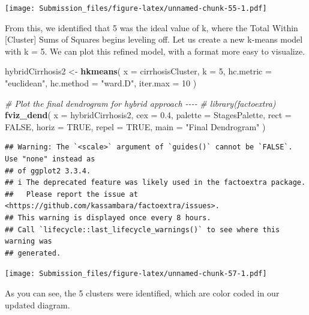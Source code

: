 \documentclass[
]{article}
\newenvironment{Shaded}{\begin{snugshade}}{\end{snugshade}}
\newcommand{\AttributeTok}[1]{\textcolor[rgb]{0.13,0.29,0.53}{#1}}
\newcommand{\CommentTok}[1]{\textcolor[rgb]{0.56,0.35,0.01}{\textit{#1}}}
\newcommand{\ConstantTok}[1]{\textcolor[rgb]{0.56,0.35,0.01}{#1}}
\newcommand{\DecValTok}[1]{\textcolor[rgb]{0.00,0.00,0.81}{#1}}
\newcommand{\FloatTok}[1]{\textcolor[rgb]{0.00,0.00,0.81}{#1}}
\newcommand{\FunctionTok}[1]{\textcolor[rgb]{0.13,0.29,0.53}{\textbf{#1}}}
\newcommand{\NormalTok}[1]{#1}
\newcommand{\OtherTok}[1]{\textcolor[rgb]{0.56,0.35,0.01}{#1}}
\newcommand{\StringTok}[1]{\textcolor[rgb]{0.31,0.60,0.02}{#1}}
\begin{document}
\texttt{[image: Submission\_files/figure-latex/unnamed-chunk-55-1.pdf]}

From this, we identified that 5 was the ideal value of k, where the
Total Within {[}Cluster{]} Sums of Squares begins leveling off. Let us
create a new k-means model with k = 5. We can plot this refined model,
with a format more easy to visualize.

\begin{Shaded}
\begin{Highlighting}[]
\NormalTok{hybridCirrhosis2 }\OtherTok{\textless{}{-}} \FunctionTok{hkmeans}\NormalTok{(}
  \AttributeTok{x =}\NormalTok{ cirrhosisCluster,}
  \AttributeTok{k =} \DecValTok{5}\NormalTok{,}
  \AttributeTok{hc.metric =} \StringTok{"euclidean"}\NormalTok{,}
  \AttributeTok{hc.method =} \StringTok{"ward.D"}\NormalTok{,}
  \AttributeTok{iter.max =} \DecValTok{10}
\NormalTok{)}
\end{Highlighting}
\end{Shaded}

\begin{Shaded}
\begin{Highlighting}[]
\CommentTok{\# Plot the final dendrogram for hybrid approach {-}{-}{-}{-}}
\CommentTok{\# library(factoextra)}
\FunctionTok{fviz\_dend}\NormalTok{(}
  \AttributeTok{x =}\NormalTok{ hybridCirrhosis2,}
  \AttributeTok{cex =} \FloatTok{0.4}\NormalTok{,}
  \AttributeTok{palette =}\NormalTok{ StagesPalette,}
  \AttributeTok{rect =} \ConstantTok{FALSE}\NormalTok{,}
  \AttributeTok{horiz =} \ConstantTok{TRUE}\NormalTok{,}
  \AttributeTok{repel =} \ConstantTok{TRUE}\NormalTok{,}
  \AttributeTok{main =} \StringTok{"Final Dendrogram"}
\NormalTok{)}
\end{Highlighting}
\end{Shaded}

\begin{verbatim}
## Warning: The `<scale>` argument of `guides()` cannot be `FALSE`. Use "none" instead as
## of ggplot2 3.3.4.
## i The deprecated feature was likely used in the factoextra package.
##   Please report the issue at <https://github.com/kassambara/factoextra/issues>.
## This warning is displayed once every 8 hours.
## Call `lifecycle::last_lifecycle_warnings()` to see where this warning was
## generated.
\end{verbatim}

\texttt{[image: Submission\_files/figure-latex/unnamed-chunk-57-1.pdf]}

As you can see, the 5 clusters were identified, which are color coded in
our updated diagram.
\end{document}
